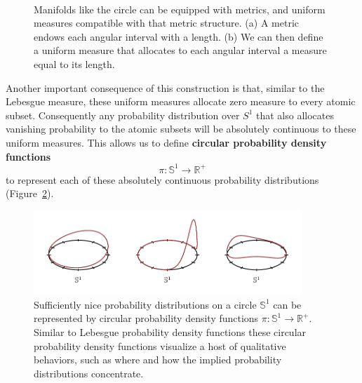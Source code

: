 \documentclass[
  letterpaper,
  DIV=11,
  numbers=noendperiod]{scrartcl}
\begin{document}
\begin{figure}
\begin{minipage}[t]{0.45\linewidth}
{{}

}

\subcaption{\label{fig-circle-measure}}
\end{minipage}%
%
\begin{minipage}[t]{0.05\linewidth}

{\centering 

~

}

\end{minipage}%

\caption{\label{fig-circle}Manifolds like the circle can be equipped
with metrics, and uniform measures compatible with that metric
structure. (a) A metric endows each angular interval with a length. (b)
We can then define a uniform measure that allocates to each angular
interval a measure equal to its length.}

\end{figure}

Another important consequence of this construction is that, similar to
the Lebesgue measure, these uniform measures allocate zero measure to
every atomic subset. Consequently any probability distribution over
\(S^{1}\) that also allocates vanishing probability to the atomic
subsets will be absolutely continuous to these uniform measures. This
allows us to define \textbf{circular probability density functions} \[
\pi : \mathbb{S}^{1} \rightarrow \mathbb{R}^{+}
\] to represent each of these absolutely continuous probability
distributions (Figure~\ref{fig-circular-density-functions}).

\begin{figure}

{\centering \includegraphics[width=0.9\textwidth,height=\textheight]{figures/circular_density_functions/circular_density_functions.pdf}

}

\caption{\label{fig-circular-density-functions}Sufficiently nice
probability distributions on a circle \(\mathbb{S}^{1}\) can be
represented by circular probability density functions
\(\pi : \mathbb{S}^{1} \rightarrow \mathbb{R}^{+}\). Similar to Lebesgue
probability density functions these circular probability density
functions visualize a host of qualitative behaviors, such as where and
how the implied probability distributions concentrate.}

\end{figure}
\end{document}
